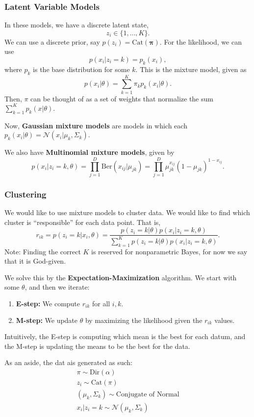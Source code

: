 \documentclass{chaistyle}
\begin{document}
\subsubsection*{Latent Variable Models}
In these models, we have a discrete latent state, \[z_i\in \{1,\dots,K\}.\] We can use a discrete prior, say \(p(z_i)=\text{Cat}(\mathbf{\pi}).\) For the likelihood, we can use \[p(x_i|z_i=k)=p_k(x_i),\] where \(p_k\) is the base distribution for some \(k.\) This is the mixture model, given as \[p(x_i|\theta)=\sum_{k=1}^{K} \pi_kp_k(x_i|\theta).\] Then, \(\pi\) can be thought of as a set of weights that normalize the sum \(\sum_{k=1}^{K} p_k(x|\theta).\)

Now, \textbf{Gaussian mixture models} are models in which each \(p_k(x_i|\theta)=\mathcal{N}(x_i|\mu_k,\Sigma_k).\)

We also have \textbf{Multinomial mixture models}, given by \[p(x_i|z_i=k,\theta)=\prod_{j=1}^{D}\text{Ber}(x_{ij}|\mu_{jk})=\prod_{j=1}^{D}\mu_{jk}^{x_{ij}}(1-\mu_{jk})^{1-x_{ij}}.\]
\subsubsection*{Clustering}
We would like to use mixture models to cluster data. We would like to find which cluster is ``responsible'' for each data point. That is, \[r_{ik}=p(z_i=k|x_i,\theta)=\frac{p(z_i=k|\theta)p(x_i|z_i=k,\theta)}{\sum_{k=1}^{K} p(z_i=k|\theta)p(x_i|z_i=k,\theta)}.\] Note: Finding the correct \(K\) is reserved for nonparametric Bayes, for now we say that it is God-given.

We solve this by the \textbf{Expectation-Maximization} algorithm. We start with some \(\theta\), and then we iterate: \begin{enumerate}
    \item \textbf{E-step:} We compute \(r_{ik}\) for all \(i,k.\)
    \item \textbf{M-step:} We update \(\theta\) by maximizing the likelihood given the \(r_{ik}\) values.
\end{enumerate}
Intuitively, the E-step is computing which mean is the best for each datum, and the M-step is updating the means to be the best for the data.
\vspace{4mm}
\begin{remark}
    As an aside, the dat ais generated as such: \begin{align*}
        \pi\sim\text{Dir}(\alpha) \\
        z_i\sim\text{Cat}(\pi) \\
        (\mu_k,\Sigma_k)\sim\text{Conjugate of Normal} \\
        x_i|z_i=k\sim \mathcal{N}(\mu_k,\Sigma_k) \\
    \end{align*}
\end{remark}
\end{document}
